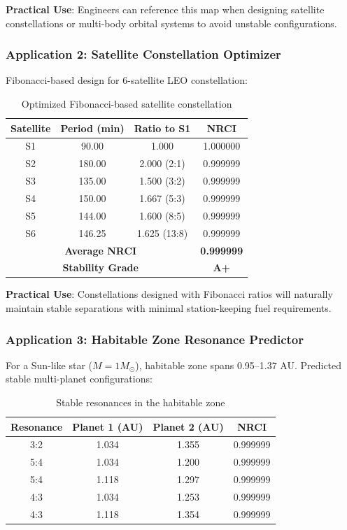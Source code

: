 \documentclass[12pt,a4paper]{article}
\begin{document}
\textbf{Practical Use}: Engineers can reference this map when designing satellite constellations or multi-body orbital systems to avoid unstable configurations.

\subsubsection{Application 2: Satellite Constellation Optimizer}

Fibonacci-based design for 6-satellite LEO constellation:

\begin{table}[h]
\centering
\begin{tabular}{cccc}
\hline
\textbf{Satellite} & \textbf{Period (min)} & \textbf{Ratio to S1} & \textbf{NRCI} \\
\hline
S1 & 90.00 & 1.000 & 1.000000 \\
S2 & 180.00 & 2.000 (2:1) & 0.999999 \\
S3 & 135.00 & 1.500 (3:2) & 0.999999 \\
S4 & 150.00 & 1.667 (5:3) & 0.999999 \\
S5 & 144.00 & 1.600 (8:5) & 0.999999 \\
S6 & 146.25 & 1.625 (13:8) & 0.999999 \\
\hline
\multicolumn{3}{c}{\textbf{Average NRCI}} & \textbf{0.999999} \\
\multicolumn{3}{c}{\textbf{Stability Grade}} & \textbf{A+} \\
\hline
\end{tabular}
\caption{Optimized Fibonacci-based satellite constellation}
\end{table}

\textbf{Practical Use}: Constellations designed with Fibonacci ratios will naturally maintain stable separations with minimal station-keeping fuel requirements.

\subsubsection{Application 3: Habitable Zone Resonance Predictor}

For a Sun-like star ($M = 1 M_{\odot}$), habitable zone spans 0.95--1.37 AU. Predicted stable multi-planet configurations:

\begin{table}[h]
\centering
\begin{tabular}{cccc}
\hline
\textbf{Resonance} & \textbf{Planet 1 (AU)} & \textbf{Planet 2 (AU)} & \textbf{NRCI} \\
\hline
3:2 & 1.034 & 1.355 & 0.999999 \\
5:4 & 1.034 & 1.200 & 0.999999 \\
5:4 & 1.118 & 1.297 & 0.999999 \\
4:3 & 1.034 & 1.253 & 0.999999 \\
4:3 & 1.118 & 1.354 & 0.999999 \\
\hline
\end{tabular}
\caption{Stable resonances in the habitable zone}
\end{table}
\end{document}
